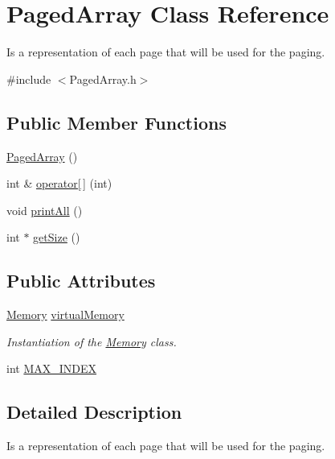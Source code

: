 \hypertarget{classPagedArray}{}\section{Paged\+Array Class Reference}
\label{classPagedArray}


Is a representation of each page that will be used for the paging.  




{\ttfamily \#include $<$Paged\+Array.\+h$>$}

\subsection*{Public Member Functions}
\begin{DoxyCompactItemize}
\item 
\mbox{\hyperlink{classPagedArray_a037f1ad3ec00a9ff2e5f28e5f9503e81}{Paged\+Array}} ()
\item 
int \& \mbox{\hyperlink{classPagedArray_a99778707be276b8a00d46e1acde5de2e}{operator\mbox{[}$\,$\mbox{]}}} (int)
\item 
void \mbox{\hyperlink{classPagedArray_a5fc2ba5b86eba79384cdb03956db1e14}{print\+All}} ()
\item 
int $\ast$ \mbox{\hyperlink{classPagedArray_a05b9be9fa91531a1228332186468513d}{get\+Size}} ()
\end{DoxyCompactItemize}
\subsection*{Public Attributes}
\begin{DoxyCompactItemize}
\item 
\mbox{\hyperlink{classMemory}{Memory}} \mbox{\hyperlink{classPagedArray_a24dfdb93699ffe361b29d43b0f78ecf1}{virtual\+Memory}}
\begin{DoxyCompactList}\small\item\em Instantiation of the \mbox{\hyperlink{classMemory}{Memory}} class. \end{DoxyCompactList}\item 
int \mbox{\hyperlink{classPagedArray_a3e41073f5476d64e7e4eeebb932c997d}{M\+A\+X\+\_\+\+I\+N\+D\+EX}}
\end{DoxyCompactItemize}


\subsection{Detailed Description}
Is a representation of each page that will be used for the paging. 

